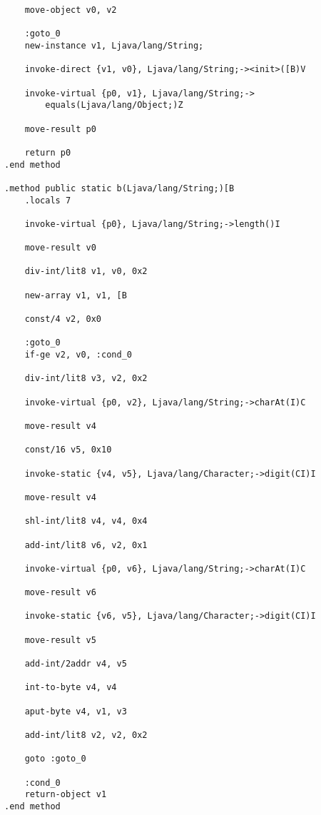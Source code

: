 \begin{verbatim}
    move-object v0, v2

    :goto_0
    new-instance v1, Ljava/lang/String;

    invoke-direct {v1, v0}, Ljava/lang/String;-><init>([B)V

    invoke-virtual {p0, v1}, Ljava/lang/String;->
        equals(Ljava/lang/Object;)Z

    move-result p0

    return p0
.end method

.method public static b(Ljava/lang/String;)[B
    .locals 7

    invoke-virtual {p0}, Ljava/lang/String;->length()I

    move-result v0

    div-int/lit8 v1, v0, 0x2

    new-array v1, v1, [B

    const/4 v2, 0x0

    :goto_0
    if-ge v2, v0, :cond_0

    div-int/lit8 v3, v2, 0x2

    invoke-virtual {p0, v2}, Ljava/lang/String;->charAt(I)C

    move-result v4

    const/16 v5, 0x10

    invoke-static {v4, v5}, Ljava/lang/Character;->digit(CI)I

    move-result v4

    shl-int/lit8 v4, v4, 0x4

    add-int/lit8 v6, v2, 0x1

    invoke-virtual {p0, v6}, Ljava/lang/String;->charAt(I)C

    move-result v6

    invoke-static {v6, v5}, Ljava/lang/Character;->digit(CI)I

    move-result v5

    add-int/2addr v4, v5

    int-to-byte v4, v4

    aput-byte v4, v1, v3

    add-int/lit8 v2, v2, 0x2

    goto :goto_0

    :cond_0
    return-object v1
.end method
\end{verbatim}
